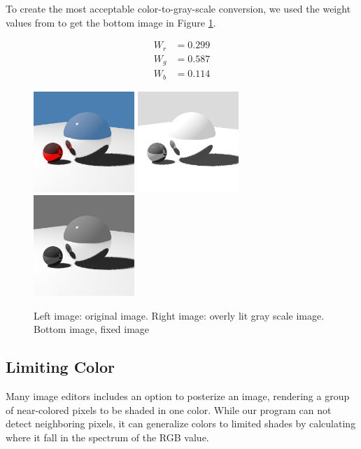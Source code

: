 \documentclass{acmsiggraph}
\begin{document}
To create the most acceptable color-to-gray-scale conversion, we used the
weight values from \cite{mw11ASCU} to get the bottom image in Figure
\ref{gray_scale}.

\begin{align}
W_{r} &= 0.299 \\
W_{g} &= 0.587 \\
W_{b} &= 0.114
\end{align}

\begin{figure}[tbp]
\centering
\includegraphics[width=1.5in]{original_color}
\includegraphics[width=1.5in]{overly_lit_gray_scale}
\includegraphics[width=1.5in]{normal_gray_scale}
\caption{Left image: original image. Right image: overly lit gray scale image.
Bottom image, fixed image}
\label{gray_scale}
\end{figure}



\subsection{Limiting Color}
Many image editors includes an option to posterize an image, rendering a group
of near-colored pixels to be shaded in one color.  While our program can not
detect neighboring pixels, it can generalize colors to limited shades by
calculating where it fall in the spectrum of the RGB value.
\end{document}
